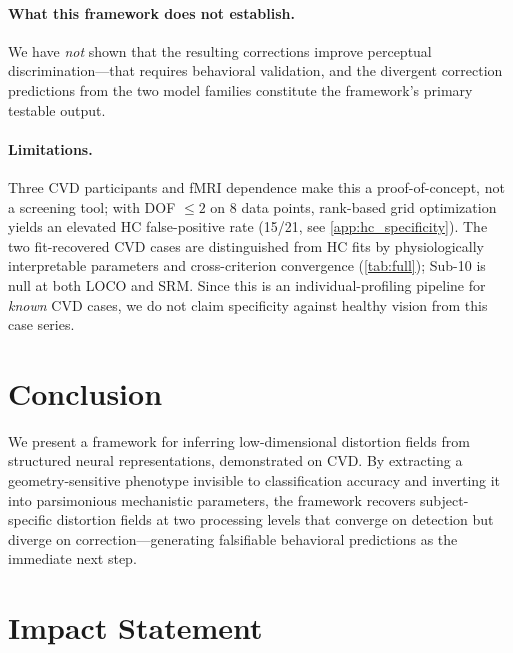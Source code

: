 \documentclass{article}
\begin{document}
\paragraph{What this framework does not establish.}
We have \emph{not} shown that the resulting corrections improve perceptual discrimination---that requires behavioral validation, and the divergent correction predictions from the two model families constitute the framework's primary testable output.

\paragraph{Limitations.}
Three CVD participants and fMRI dependence make this a proof-of-concept, not a screening tool; with DOF $\leq 2$ on 8 data points, rank-based grid optimization yields an elevated HC false-positive rate (15/21, see \cref{app:hc_specificity}).
The two fit-recovered CVD cases are distinguished from HC fits by physiologically interpretable parameters and cross-criterion convergence (\cref{tab:full}); Sub-10 is null at both LOCO and SRM.
Since this is an individual-profiling pipeline for \emph{known} CVD cases, we do not claim specificity against healthy vision from this case series.

\section{Conclusion}
\label{sec:conclusion}

We present a framework for inferring low-dimensional distortion fields from structured neural representations, demonstrated on CVD.
By extracting a geometry-sensitive phenotype invisible to classification accuracy and inverting it into parsimonious mechanistic parameters, the framework recovers subject-specific distortion fields at two processing levels that converge on detection but diverge on correction---generating falsifiable behavioral predictions as the immediate next step.

\section*{Impact Statement}
\end{document}
